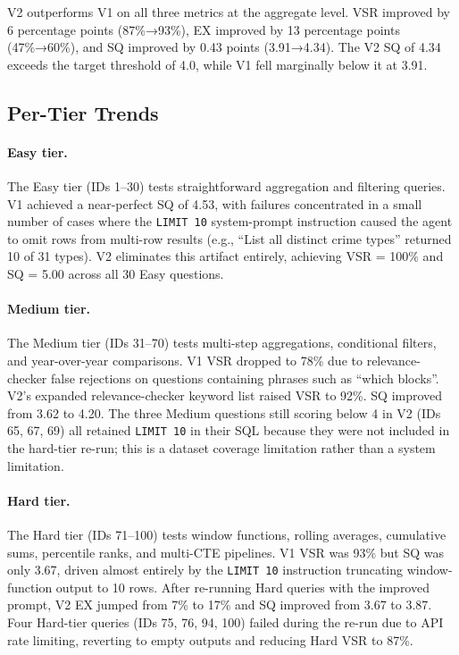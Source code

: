V2 outperforms V1 on all three metrics at the aggregate level. VSR improved by
6 percentage points (87\%→93\%), EX improved by 13 percentage points (47\%→60\%),
and SQ improved by 0.43 points (3.91→4.34). The V2 SQ of 4.34 exceeds the
target threshold of 4.0, while V1 fell marginally below it at 3.91.

\subsection{Per-Tier Trends}

\paragraph{Easy tier.}
The Easy tier (IDs 1–30) tests straightforward aggregation and filtering queries.
V1 achieved a near-perfect SQ of 4.53, with failures concentrated in a small
number of cases where the \texttt{LIMIT 10} system-prompt instruction caused the
agent to omit rows from multi-row results (e.g., ``List all distinct crime types''
returned 10 of 31 types). V2 eliminates this artifact entirely, achieving
VSR = 100\% and SQ = 5.00 across all 30 Easy questions.

\paragraph{Medium tier.}
The Medium tier (IDs 31–70) tests multi-step aggregations, conditional filters,
and year-over-year comparisons. V1 VSR dropped to 78\% due to relevance-checker
false rejections on questions containing phrases such as ``which blocks''. V2's
expanded relevance-checker keyword list raised VSR to 92\%. SQ improved from 3.62
to 4.20. The three Medium questions still scoring below 4 in V2 (IDs 65, 67, 69)
all retained \texttt{LIMIT 10} in their SQL because they were not included in
the hard-tier re-run; this is a dataset coverage limitation rather than a system
limitation.

\paragraph{Hard tier.}
The Hard tier (IDs 71–100) tests window functions, rolling averages, cumulative
sums, percentile ranks, and multi-CTE pipelines. V1 VSR was 93\% but SQ was only
3.67, driven almost entirely by the \texttt{LIMIT 10} instruction truncating
window-function output to 10 rows. After re-running Hard queries with the improved
prompt, V2 EX jumped from 7\% to 17\% and SQ improved from 3.67 to 3.87. Four
Hard-tier queries (IDs 75, 76, 94, 100) failed during the re-run due to API rate
limiting, reverting to empty outputs and reducing Hard VSR to 87\%.

